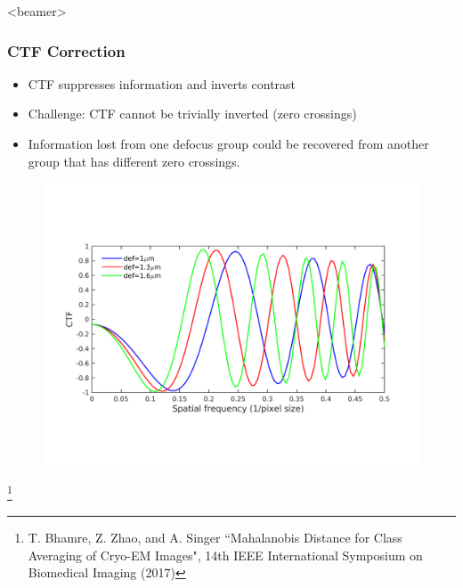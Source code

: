 \documentclass{beamer}
\begin{document}
\begin{frame}<beamer>
\frametitle{CTF Correction}
\begin{itemize}
\item CTF suppresses information and inverts contrast
\item \alert{Challenge}: CTF cannot be trivially inverted (zero crossings)
\item Information lost from one defocus group could be recovered from another group that has different zero crossings.
\end{itemize}
\vspace{-3mm}
\begin{figure}[]
 \includegraphics[scale=0.4]{ctfeg_fig.png}
 \end{figure}
 \footnote{T. Bhamre, Z. Zhao, and A. Singer ``Mahalanobis Distance for Class Averaging of Cryo-EM Images", 14th IEEE International Symposium on Biomedical Imaging (2017)}
\end{frame}
\end{document}

